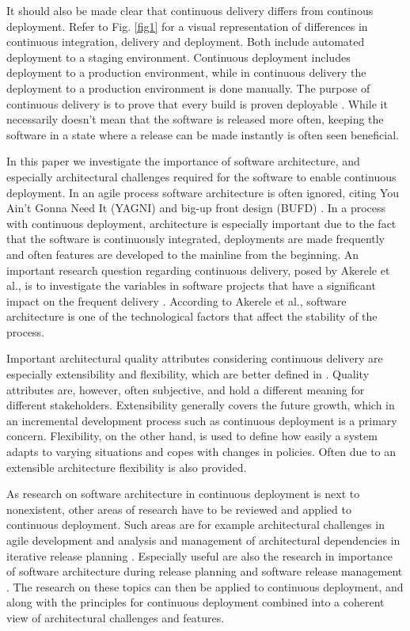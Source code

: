 \documentclass[conference]{IEEEtran}
\begin{document}
It should also be made clear that continuous delivery differs from continous deployment. Refer to Fig. \ref{fig1} for a visual representation of differences in continuous integration, delivery and deployment. Both include automated deployment to a staging environment. Continuous deployment includes deployment to a production environment, while in continuous delivery the deployment to a production environment is done manually. The purpose of continuous delivery is to prove that every build is proven deployable \cite{cdbook}. While it necessarily doesn't mean that the software is released more often, keeping the software in a state where a release can be made instantly is often seen beneficial.

In this paper we investigate the importance of software architecture, and especially architectural challenges required for the software to enable continuous deployment. In an agile process software architecture is often ignored, citing You Ain't Gonna Need It (YAGNI) and big-up front design (BUFD) \cite{kruchten2010software}. In a process with continuous deployment, architecture is especially important due to the fact that the software is continuously integrated, deployments are made frequently and often features are developed to the mainline from the beginning. An important research question regarding continuous delivery, posed by Akerele et al., is to investigate the variables in software projects that have a significant impact on the frequent delivery \cite{6612879}. According to Akerele et al., software architecture is one of the technological factors that affect the stability of the process. 

Important architectural quality attributes considering continuous delivery are especially extensibility and flexibility, which are better defined in \cite{kaisler2005software}. Quality attributes are, however, often subjective, and hold a different meaning for different stakeholders. Extensibility generally covers the future growth, which in an incremental development process such as continuous deployment is a primary concern. Flexibility, on the other hand, is used to define how easily a system adapts to varying situations and copes with changes in policies. Often due to an extensible architecture flexibility is also provided. 

As research on software architecture in continuous deployment is next to nonexistent, other areas of research have to be reviewed and applied to continuous deployment. Such areas are for example architectural challenges in agile development \cite{kruchten2010software} and analysis and management of architectural dependencies in iterative release planning \cite{brown2011analysis}. Especially useful are also the research in importance of software architecture during release planning \cite{lindgren2008importance} and software release management \cite{van1997software}. The research on these topics can then be applied to continuous deployment, and along with the principles for continuous deployment \cite{humble2006deployment} combined into a coherent view of architectural challenges and features. 
\end{document}
